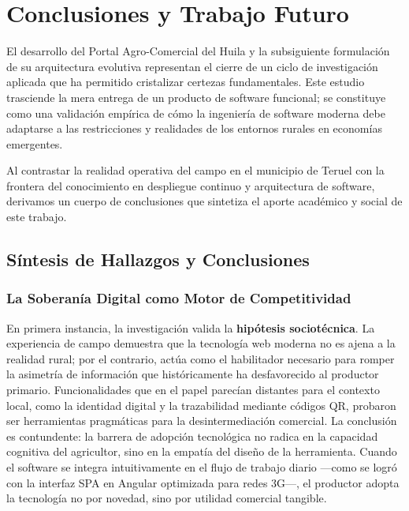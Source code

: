 \section{Conclusiones y Trabajo Futuro}

El desarrollo del Portal Agro-Comercial del Huila y la subsiguiente formulación de su arquitectura evolutiva representan el cierre de un ciclo de investigación aplicada que ha permitido cristalizar certezas fundamentales. Este estudio trasciende la mera entrega de un producto de software funcional; se constituye como una validación empírica de cómo la ingeniería de software moderna debe adaptarse a las restricciones y realidades de los entornos rurales en economías emergentes.

Al contrastar la realidad operativa del campo en el municipio de Teruel con la frontera del conocimiento en despliegue continuo y arquitectura de software, derivamos un cuerpo de conclusiones que sintetiza el aporte académico y social de este trabajo.

\subsection{Síntesis de Hallazgos y Conclusiones}

\subsubsection{La Soberanía Digital como Motor de Competitividad}
En primera instancia, la investigación valida la \textbf{hipótesis sociotécnica}. La experiencia de campo demuestra que la tecnología web moderna no es ajena a la realidad rural; por el contrario, actúa como el habilitador necesario para romper la asimetría de información que históricamente ha desfavorecido al productor primario. Funcionalidades que en el papel parecían distantes para el contexto local, como la identidad digital y la trazabilidad mediante códigos QR, probaron ser herramientas pragmáticas para la desintermediación comercial. La conclusión es contundente: la barrera de adopción tecnológica no radica en la capacidad cognitiva del agricultor, sino en la empatía del diseño de la herramienta. Cuando el software se integra intuitivamente en el flujo de trabajo diario —como se logró con la interfaz SPA en Angular optimizada para redes 3G—, el productor adopta la tecnología no por novedad, sino por utilidad comercial tangible.

